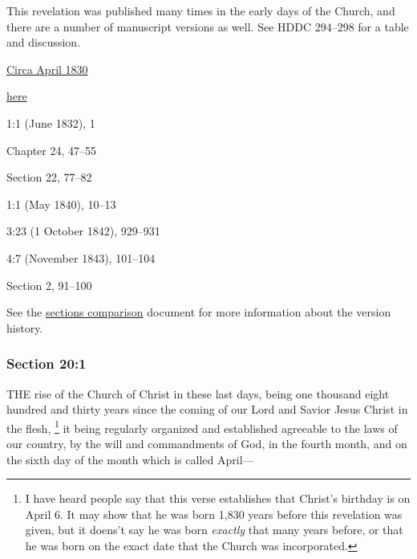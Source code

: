 		This revelation was published many times in the early days of the Church, and there are a number of manuscript versions as well. See HDDC 294--298 for a table and discussion.
		
		\medskip
	
		\begin{compactdesc}
			\item[JSP] \hyperref[EMS-1830-JS-CIR-APR-1830]{Circa April 1830}
			\item[RB1] \hyperref[EXSS-DC20-RB1]{here}
			\item[EMS] 1:1 (June 1832), 1
			\item[BC] Chapter 24, 47--55
			\item[DC 1835] Section 22, 77--82
			\item[MS] 1:1 (May 1840), 10--13
			\item[TS] 3:23 (1 October 1842), 929--931
			\item[MS] 4:7 (November 1843), 101--104
			\item[DC 1844] Section 2, 91--100
		\end{compactdesc}
		
		\medskip
		
		See the \href{https://drive.google.com/file/d/1goAvNz8jS4R8slYfMG_db55Ty2z_vmgK/view?usp=sharing}{sections comparison} document for more information about the version history.

	\subsubsection{Section 20:1} %
		\label{DC20-1}

		THE rise of the Church of Christ in these last days, being one thousand eight hundred and thirty years since the coming of our Lord and Savior Jesus Christ in the flesh,%
			\footnote{%
				I have heard people say that this verse establishes that Christ's birthday is on April 6. It may show that he was born 1,830 years before this revelation was given, but it doens't say he was born \textit{exactly} that many years before, or that he was born on the exact date that the Church was incorporated.
				}
		it being regularly organized and established agreeable to the laws of our country, by the will and commandments of God, in the fourth month, and on the sixth day of the month which is called April---

